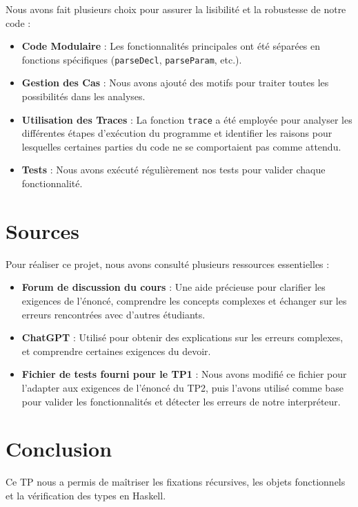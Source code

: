 \documentclass[a4paper,12pt]{article}
\begin{document}
Nous avons fait plusieurs choix pour assurer la lisibilité et la robustesse de notre code :

\begin{itemize}
    \item \textbf{Code Modulaire} : Les fonctionnalités principales ont été séparées en fonctions spécifiques (\texttt{parseDecl}, \texttt{parseParam}, etc.).
    \item \textbf{Gestion des Cas} : Nous avons ajouté des motifs pour traiter toutes les possibilités dans les analyses.
    \item \textbf{Utilisation des Traces} : La fonction \texttt{trace} a été employée pour analyser les différentes étapes d'exécution du programme et identifier les raisons pour lesquelles certaines parties du code ne se comportaient pas comme attendu.
    \item \textbf{Tests} : Nous avons exécuté régulièrement nos tests pour valider chaque fonctionnalité.
\end{itemize}

\section{Sources}

Pour réaliser ce projet, nous avons consulté plusieurs ressources essentielles :

\begin{itemize}
    \item \textbf{Forum de discussion du cours} : Une aide précieuse pour clarifier les exigences de l'énoncé, comprendre les concepts complexes et échanger sur les erreurs rencontrées avec d'autres étudiants.
    \item \textbf{ChatGPT} : Utilisé pour obtenir des explications sur les erreurs complexes, et comprendre certaines exigences du devoir.
    \item \textbf{Fichier de tests fourni pour le TP1} : Nous avons modifié ce fichier pour l'adapter aux exigences de l'énoncé du TP2, puis l'avons utilisé comme base pour valider les fonctionnalités et détecter les erreurs de notre interpréteur.
\end{itemize}

\section{Conclusion}

Ce TP nous a permis de maîtriser les fixations récursives, les objets fonctionnels et la vérification des types en Haskell.
\end{document}
